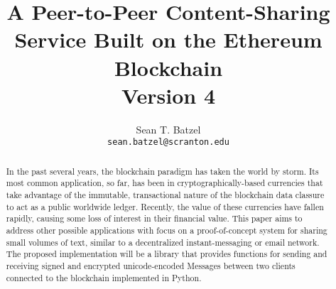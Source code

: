 \documentclass[]{article}
\title{A Peer-to-Peer Content-Sharing Service Built on the Ethereum Blockchain\\\large Version 4}
\author{Sean T. Batzel\\\texttt{sean.batzel@scranton.edu}}
\begin{document}
\maketitle
\tableofcontents

\pagebreak

\begin{abstract}
  In the past several years, the \gls{blockchain} paradigm has taken the world by storm. Its most common application, so far, has been in cryptographically-based currencies that take advantage of the immutable, transactional nature of the blockchain data classure to act as a public worldwide ledger. Recently, the value of these currencies have fallen rapidly, causing some loss of interest in their financial value. This paper aims to address other possible applications with focus on a proof-of-concept system for sharing small volumes of text, similar to a decentralized instant-messaging or email network. The proposed implementation will be a library that provides functions for sending and receiving signed and encrypted unicode-encoded Messages between two clients connected to the blockchain implemented in Python.
\end{abstract}
\end{document}

